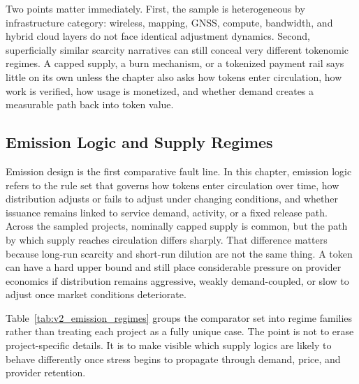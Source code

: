 Two points matter immediately. First, the sample is heterogeneous by infrastructure category: wireless, mapping, GNSS, compute, bandwidth, and hybrid cloud layers do not face identical adjustment dynamics. Second, superficially similar scarcity narratives can still conceal very different tokenomic regimes. A capped supply, a burn mechanism, or a tokenized payment rail says little on its own unless the chapter also asks how tokens enter circulation, how work is verified, how usage is monetized, and whether demand creates a measurable path back into token value.

\subsection{Emission Logic and Supply Regimes}
Emission design is the first comparative fault line. In this chapter, emission logic refers to the rule set that governs how tokens enter circulation over time, how distribution adjusts or fails to adjust under changing conditions, and whether issuance remains linked to service demand, activity, or a fixed release path. Across the sampled projects, nominally capped supply is common, but the path by which supply reaches circulation differs sharply. That difference matters because long-run scarcity and short-run dilution are not the same thing. A token can have a hard upper bound and still place considerable pressure on provider economics if distribution remains aggressive, weakly demand-coupled, or slow to adjust once market conditions deteriorate.

Table~\ref{tab:v2_emission_regimes} groups the comparator set into regime families rather than treating each project as a fully unique case. The point is not to erase project-specific details. It is to make visible which supply logics are likely to behave differently once stress begins to propagate through demand, price, and provider retention.

